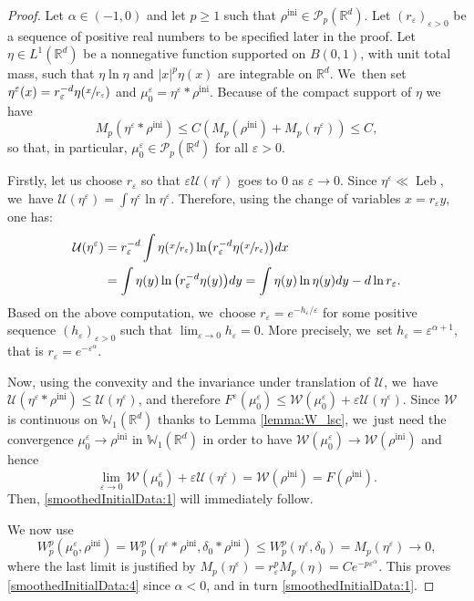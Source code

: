 \documentclass[11pt]{article}
\numberwithin{equation}{section}
\newcommand{\ini}{\mathrm{ini}}
\DeclareMathOperator{\Leb}{Leb}
\def\RR{\mathbb{R}}
\def\WW{\mathbb{W}}
\def\eps{\varepsilon}
\def\calP{{\mathcal P}}
\def\calU{{\mathcal U}}
\def\calW{{\mathcal W}}
\theoremstyle{plain}
\theoremstyle{definition}
\begin{document}
\begin{proof}
Let $\alpha \in (-1,0)$ and let $p \geq 1$ such that $\rho^{\ini} \in \calP_p(\RR^d)$. Let $(r_\eps)_{\eps > 0}$ be a sequence of positive real numbers to be specified later in the proof. Let $\eta \in L^1(\RR^d)$ be a nonnegative function supported on $B(0,1)$, with unit total mass, such that $\eta \ln \eta$ and $|x|^p \eta(x)$ are integrable on $\RR^d$. We~then set $\eta^\eps(x) = r_\eps^{-d} \eta(\sfrac{x}{r_\eps})$ and $\mu_0^\eps = \eta^\eps * \rho^{\ini}$. Because of the compact support of $\eta$ we have
\[
M_p(\eta^\eps * \rho^{\ini}) \leq C(M_p(\rho^{\ini})+M_p(\eta^\eps))\leq C,
\]
so that, in particular, $\mu_0^\eps \in \calP_p(\RR^d)$ for all $\eps>0$.

Firstly, let us choose $r_\eps$ so that $\eps \calU(\eta^\eps)$ goes to 0 as $\eps \to 0$. Since $\eta^\eps \ll \Leb$, we~have $\calU(\eta^\eps) = \int \eta^\eps \ln \eta^\eps$. Therefore, using the change of variables $x = r_\eps y$, one has:
\[
\begin{aligned}
\calU(\eta^\eps) &= r_\eps^{-d} \int \eta(\sfrac{x}{r_\eps}) \ln \bigl( r_\eps^{-d} \eta(\sfrac{x}{r_\eps}) \bigr) dx\\
& = \int \eta(y) \ln \big(r_\eps^{-d} \eta(y)\big) dy 
= \int \eta(y) \ln \eta(y) dy - d \ln r_\eps.
\end{aligned}
\]
Based on the above computation, we~choose $r_\eps = e^{-h_\eps / \eps}$ for some positive sequence $(h_\eps)_{\eps>0}$ such that $\lim_{\eps \to 0} h_\eps = 0$. More precisely, we~set $h_\eps = \eps^{\alpha + 1}$, that is $r_\eps = e^{-\eps^\alpha}$.

Now, using the convexity and the invariance under translation of $\calU$, we~have \hbox{$\calU(\eta^\eps * \rho^{\ini}) \leq \calU(\eta^\eps)$}, and therefore $F^\eps(\mu_0^\eps) \leq \calW(\mu_0^\eps) + \eps \calU(\eta^\eps)$. Since $\calW$ is continuous on $\WW_1(\RR^d)$ thanks to Lemma \ref{lemma:W_lsc}, we~just need the convergence $\mu_0^\eps\to\rho^{\ini}$ in $\WW_1(\RR^d)$ in order to have $\calW(\mu_0^\eps) \to \calW(\rho^{\ini})$ and hence
\[
\lim_{\eps \to 0} \calW(\mu_0^\eps) + \eps \calU(\eta^\eps) = \calW(\rho^{\ini}) = F(\rho^{\ini}).
\]
Then, \eqref{smoothedInitialData:1} will immediately follow.

We now use
\[
W_p^p(\mu_0^\eps,\rho^{\ini}) = W_p^p(\eta^\eps * \rho^{\ini}, \delta_0 * \rho^{\ini}) \leq W_p^p(\eta^\eps, \delta_0) = M_p(\eta^\eps)\to 0,
\]
where the last limit is justified by $M_p(\eta^\eps) = r_\eps^p M_p(\eta) = C e^{-p\eps^\alpha}$. This proves
\eqref{smoothedInitialData:4} since $\alpha < 0$, and in turn \eqref{smoothedInitialData:1}.
\end{proof}
\end{document}
